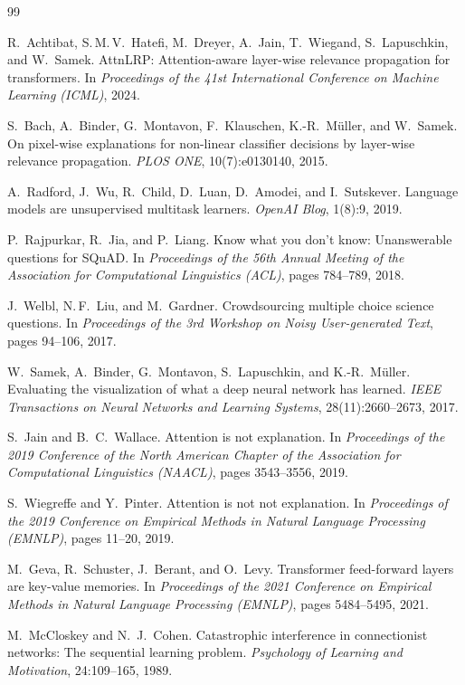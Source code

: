 \documentclass[10pt,twocolumn,letterpaper]{article}
\begin{document}
\begin{thebibliography}{99}

R.~Achtibat, S.\,M.\,V.~Hatefi, M.~Dreyer, A.~Jain, T.~Wiegand,
S.~Lapuschkin, and W.~Samek.
\newblock AttnLRP: Attention-aware layer-wise relevance propagation for
  transformers.
\newblock In \emph{Proceedings of the 41st International Conference on Machine
  Learning (ICML)}, 2024.

S.~Bach, A.~Binder, G.~Montavon, F.~Klauschen, K.-R.~M{\"u}ller, and
W.~Samek.
\newblock On pixel-wise explanations for non-linear classifier decisions by
  layer-wise relevance propagation.
\newblock \emph{PLOS ONE}, 10(7):e0130140, 2015.

A.~Radford, J.~Wu, R.~Child, D.~Luan, D.~Amodei, and I.~Sutskever.
\newblock Language models are unsupervised multitask learners.
\newblock \emph{OpenAI Blog}, 1(8):9, 2019.

P.~Rajpurkar, R.~Jia, and P.~Liang.
\newblock Know what you don't know: Unanswerable questions for SQuAD.
\newblock In \emph{Proceedings of the 56th Annual Meeting of the Association
  for Computational Linguistics (ACL)}, pages 784--789, 2018.

J.~Welbl, N.\,F.~Liu, and M.~Gardner.
\newblock Crowdsourcing multiple choice science questions.
\newblock In \emph{Proceedings of the 3rd Workshop on Noisy User-generated
  Text}, pages 94--106, 2017.

W.~Samek, A.~Binder, G.~Montavon, S.~Lapuschkin, and K.-R.~M{\"u}ller.
\newblock Evaluating the visualization of what a deep neural network has
  learned.
\newblock \emph{IEEE Transactions on Neural Networks and Learning Systems},
  28(11):2660--2673, 2017.

S.~Jain and B.~C.~Wallace.
\newblock Attention is not explanation.
\newblock In \emph{Proceedings of the 2019 Conference of the North American
  Chapter of the Association for Computational Linguistics (NAACL)},
  pages 3543--3556, 2019.

S.~Wiegreffe and Y.~Pinter.
\newblock Attention is not not explanation.
\newblock In \emph{Proceedings of the 2019 Conference on Empirical Methods
  in Natural Language Processing (EMNLP)}, pages 11--20, 2019.

M.~Geva, R.~Schuster, J.~Berant, and O.~Levy.
\newblock Transformer feed-forward layers are key-value memories.
\newblock In \emph{Proceedings of the 2021 Conference on Empirical Methods
  in Natural Language Processing (EMNLP)}, pages 5484--5495, 2021.

M.~McCloskey and N.~J.~Cohen.
\newblock Catastrophic interference in connectionist networks: The sequential
  learning problem.
\newblock \emph{Psychology of Learning and Motivation}, 24:109--165, 1989.

\end{thebibliography}
\end{document}
